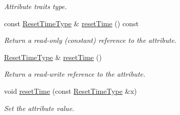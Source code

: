 \begin{DoxyCompactItemize}
\begin{DoxyCompactList}\small\item\em Attribute traits type. \item\end{DoxyCompactList}\item 
const \hyperlink{classopenstack_1_1xml_1_1RateLimit_a040904fe6210dfa7070906275285989b}{ResetTimeType} \& \hyperlink{classopenstack_1_1xml_1_1RateLimit_af3a6e7fb77881acafc82fda2e6bdda41}{resetTime} () const 
\begin{DoxyCompactList}\small\item\em Return a read-\/only (constant) reference to the attribute. \item\end{DoxyCompactList}\item 
\hyperlink{classopenstack_1_1xml_1_1RateLimit_a040904fe6210dfa7070906275285989b}{ResetTimeType} \& \hyperlink{classopenstack_1_1xml_1_1RateLimit_a9730806e581387d5b07a1e686b42b737}{resetTime} ()
\begin{DoxyCompactList}\small\item\em Return a read-\/write reference to the attribute. \item\end{DoxyCompactList}\item 
void \hyperlink{classopenstack_1_1xml_1_1RateLimit_a3be4eef33d9e4666ee4adf1da63b6e25}{resetTime} (const \hyperlink{classopenstack_1_1xml_1_1RateLimit_a040904fe6210dfa7070906275285989b}{ResetTimeType} \&x)
\begin{DoxyCompactList}\small\item\em Set the attribute value. \item\end{DoxyCompactList}\end{DoxyCompactItemize}
